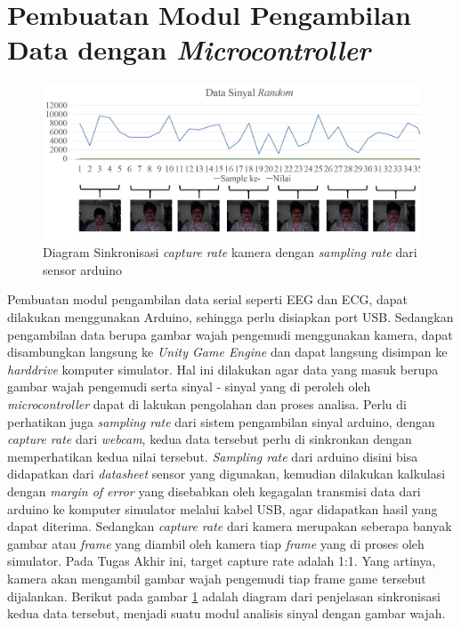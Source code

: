 \section{Pembuatan Modul Pengambilan Data dengan \textit{Microcontroller}}
\label{microcontroller}
\vspace{1ex}

    \begin{figure}  [!htb]
	    \captionsetup{justification=centering}
	    \includegraphics[scale=0.2]{img/sinyaldangambar.JPG}
	    \caption{Diagram Sinkronisasi \textit{capture rate} kamera dengan \textit{sampling rate} dari sensor arduino}
	    \label{fig: 3_30}
    \end{figure}
    
    Pembuatan modul pengambilan data serial seperti EEG dan ECG, dapat dilakukan menggunakan Arduino, sehingga perlu disiapkan port USB. Sedangkan pengambilan data berupa gambar wajah pengemudi menggunakan kamera, dapat disambungkan langsung ke \textit{Unity Game Engine} dan dapat langsung disimpan ke \textit{harddrive} komputer simulator. Hal ini dilakukan agar data yang masuk berupa gambar wajah pengemudi serta sinyal - sinyal yang di peroleh oleh \textit{microcontroller} dapat di lakukan pengolahan dan proses analisa.
    Perlu di perhatikan juga \textit{sampling rate} dari sistem pengambilan sinyal arduino, dengan \textit{capture rate} dari \textit{webcam}, kedua data tersebut perlu di sinkronkan dengan memperhatikan kedua nilai tersebut. \textit{Sampling rate} dari arduino disini bisa didapatkan dari \textit{datasheet} sensor yang digunakan, kemudian dilakukan kalkulasi dengan \textit{margin of error} yang disebabkan oleh kegagalan transmisi data dari arduino ke komputer simulator melalui kabel USB, agar didapatkan hasil yang dapat diterima. Sedangkan \textit{capture rate} dari kamera merupakan seberapa banyak gambar atau \textit{frame} yang diambil oleh kamera tiap \textit{frame} yang di proses oleh simulator. Pada Tugas Akhir ini, target capture rate adalah 1:1. Yang artinya, kamera akan mengambil gambar wajah pengemudi tiap frame game tersebut dijalankan. Berikut pada gambar \ref{fig: 3_30} adalah diagram dari penjelasan sinkronisasi kedua data tersebut, menjadi suatu modul analisis sinyal dengan gambar wajah.
    
